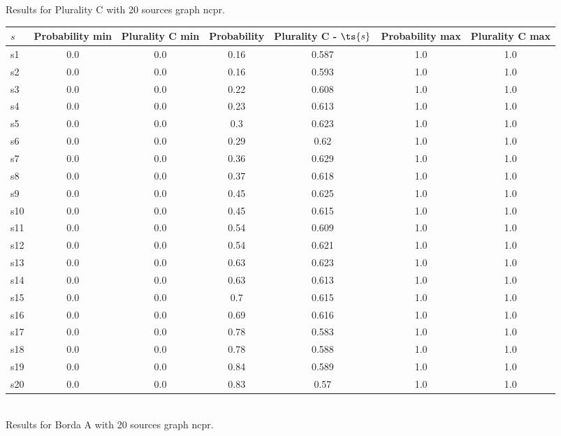 \documentclass{article}
\begin{document}
\noindent Results for Plurality C with 20 sources graph ncpr.

\noindent\begin{tabular}{|l|c|c|c|c|c|c|}
\hline
$s$& Probability min & Plurality C min & Probability & Plurality C - $\ts{s}$ & Probability max & Plurality C max\\
\hline
s1 &0.0 & 0.0 & 0.16 & 0.587 & 1.0 & 1.0\\
\hline
s2 &0.0 & 0.0 & 0.16 & 0.593 & 1.0 & 1.0\\
\hline
s3 &0.0 & 0.0 & 0.22 & 0.608 & 1.0 & 1.0\\
\hline
s4 &0.0 & 0.0 & 0.23 & 0.613 & 1.0 & 1.0\\
\hline
s5 &0.0 & 0.0 & 0.3 & 0.623 & 1.0 & 1.0\\
\hline
s6 &0.0 & 0.0 & 0.29 & 0.62 & 1.0 & 1.0\\
\hline
s7 &0.0 & 0.0 & 0.36 & 0.629 & 1.0 & 1.0\\
\hline
s8 &0.0 & 0.0 & 0.37 & 0.618 & 1.0 & 1.0\\
\hline
s9 &0.0 & 0.0 & 0.45 & 0.625 & 1.0 & 1.0\\
\hline
s10 &0.0 & 0.0 & 0.45 & 0.615 & 1.0 & 1.0\\
\hline
s11 &0.0 & 0.0 & 0.54 & 0.609 & 1.0 & 1.0\\
\hline
s12 &0.0 & 0.0 & 0.54 & 0.621 & 1.0 & 1.0\\
\hline
s13 &0.0 & 0.0 & 0.63 & 0.623 & 1.0 & 1.0\\
\hline
s14 &0.0 & 0.0 & 0.63 & 0.613 & 1.0 & 1.0\\
\hline
s15 &0.0 & 0.0 & 0.7 & 0.615 & 1.0 & 1.0\\
\hline
s16 &0.0 & 0.0 & 0.69 & 0.616 & 1.0 & 1.0\\
\hline
s17 &0.0 & 0.0 & 0.78 & 0.583 & 1.0 & 1.0\\
\hline
s18 &0.0 & 0.0 & 0.78 & 0.588 & 1.0 & 1.0\\
\hline
s19 &0.0 & 0.0 & 0.84 & 0.589 & 1.0 & 1.0\\
\hline
s20 &0.0 & 0.0 & 0.83 & 0.57 & 1.0 & 1.0\\
\hline
\end{tabular}\\

\noindent Results for Borda A with 20 sources graph ncpr.
\end{document}
